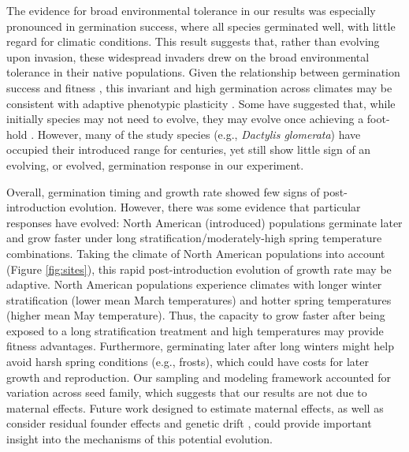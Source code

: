 \documentclass[11pt]{article}\usepackage[]{graphicx}\usepackage[]{color}
\begin{document}
	The evidence for broad environmental tolerance in our results was especially pronounced in germination success, where all species germinated well, with little regard for climatic conditions. This result suggests that, rather than evolving upon invasion, these widespread invaders drew on the broad environmental tolerance in their native populations. Given the relationship between germination success and fitness \parencite[e.g.,][]{Domic2020}, this invariant and high germination across climates may be consistent with adaptive phenotypic plasticity \parencite{Baker1965}. Some have suggested that, while initially species may not need to evolve, they may evolve once achieving a foot-hold \parencite{Lamarque2015}. However, many of the study species (e.g., \textit{Dactylis glomerata}) have occupied their introduced range for centuries, yet still show little sign of an evolving, or evolved, germination response in our experiment. 

	Overall, germination timing and growth rate showed few signs of post-introduction evolution. However, there was some evidence that particular responses have evolved: North American (introduced) populations germinate later and grow faster under long stratification/moderately-high spring temperature combinations. Taking the climate of North American populations into account (Figure \ref{fig:sites}), this rapid post-introduction evolution of growth rate may be adaptive. North American populations experience climates with longer winter stratification  (lower mean March temperatures) and hotter spring temperatures (higher mean May temperature). Thus, the capacity to grow faster after being exposed to a long stratification treatment and high temperatures may provide fitness advantages. Furthermore, germinating later after long winters might help avoid harsh spring conditions  (e.g., frosts), which could have costs for later growth and reproduction.  Our sampling and modeling framework accounted for variation across seed family, which suggests that our results are not due to maternal effects. Future work designed to estimate maternal effects, as well as consider residual founder effects \parencite{Shirk2014} and genetic drift \parencite{Eckert1996}, could provide important insight into the mechanisms of this potential evolution. %
\end{document}

